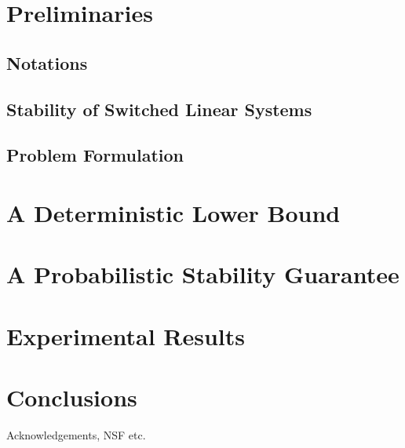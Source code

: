\documentclass[twocolumn]{autart}
\begin{document}
\section{Preliminaries}\label{sec:preliminaries}
\subsection{Notations}
 
\subsection{Stability of Switched Linear Systems}\label{sec:stab}

\subsection{Problem Formulation}


\section{A Deterministic Lower Bound}\label{sec:lowerBound}


\section{A Probabilistic Stability Guarantee}\label{sec:upperbound}



\section{Experimental Results}\label{sec:experiments}


\section{Conclusions}\label{sec:conclusions}



\begin{ack}                               %
Acknowledgements, NSF etc.  %
\end{ack}

 


\appendix\label{appendix}

\end{document}
